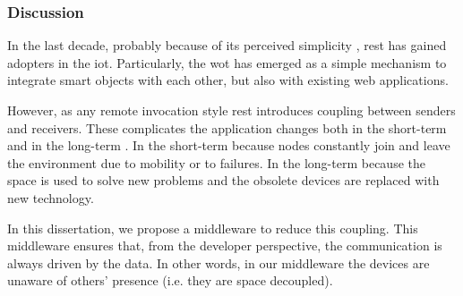 \subsubsection{Discussion}


In the last decade, probably because of its perceived simplicity \citep{guinard_search_2011}, \ac{rest} has gained adopters in the \ac{iot}.
Particularly, the \ac{wot} has emerged as a simple mechanism to integrate smart objects with each other, but also with existing web applications.

However, as any remote invocation style \ac{rest} introduces coupling between senders and receivers.
These complicates the application changes both in the short-term and in the long-term \citep{johanson_extending_2004}.
In the short-term because nodes constantly join and leave the environment due to mobility or to failures.
In the long-term because the space is used to solve new problems and the obsolete devices are replaced with new technology.

In this dissertation, we propose a middleware to reduce this coupling.
This middleware ensures that, from the developer perspective, the communication is always driven by the data.
In other words, in our middleware the devices are unaware of others' presence (i.e. they are \ac{space decoupled}).